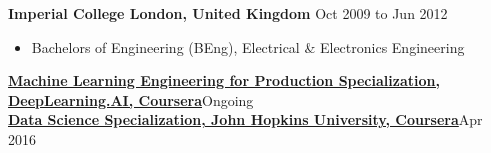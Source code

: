 \documentclass[10pt]{article}
\newenvironment{outerlist}[1][\enskip\textbullet]%
        {\begin{itemize}[#1,leftmargin=*]}{\end{itemize}%
         \vspace{-.6\baselineskip}}
\newenvironment{innerlist}[1][\enskip\textbullet]%
        {\begin{itemize}[#1,leftmargin=*,parsep=0pt,itemsep=0pt,topsep=0pt,partopsep=0pt]}
        {\end{itemize}}
\begin{document}
{\begin{minipage}[t]{\textwidth+\marginparwidth+\marginparsep}
        \vspace{.1in}
        {\textbf{Imperial College London, United Kingdom}} \hfill {Oct 2009 to Jun 2012}
        \begin{outerlist}
        \item[] Bachelors of Engineering (BEng), {Electrical \& Electronics Engineering}
        \end{outerlist}

        \vspace{.1in}
        {\bf \href{https://www.coursera.org/specializations/machine-learning-engineering-for-production-mlops}{Machine Learning Engineering for Production Specialization, DeepLearning.AI, Coursera}}\hfill{Ongoing}\\

        \vspace{-.1in}
        {\bf \href{https://www.coursera.org/account/accomplishments/specialization/YP6NMPR4X3M9}{Data Science Specialization, John Hopkins University, Coursera}}\hfill{Apr 2016}\\[-0.1in]

    \end{minipage}
}\\[.15\baselineskip]

\newpage

\end{document}
